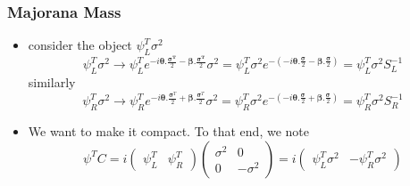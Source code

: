 \documentclass{beamer}
\begin{document}
 











 
\begin{frame}
	\frametitle{Majorana Mass}
		\begin{itemize}



		\item consider the object $\psi_{L}^{T}\sigma^{2}$	
		\pause
\[
\psi_{L}^{T}\sigma^{2}\rightarrow\psi_{L}^{T}e^{-i\mathbf{\theta}.\frac{\mathbf{\sigma^{T}}}{2}-\mathbf{\beta}.\frac{\mathbf{\sigma^{T}}}{2}}\sigma^{2}=\psi_{L}^{T}\sigma^{2}e^{-\left(-i\mathbf{\theta}.\frac{\mathbf{\sigma}}{2}-\mathbf{\beta}.\frac{\mathbf{\sigma}}{2}\right)}=\psi_{L}^{T}\sigma^{2}S_{L}^{-1}
\]
		\pause
		similarly
\[
\psi_{R}^{T}\sigma^{2}\rightarrow\psi_{R}^{T}e^{-i\mathbf{\theta}.\frac{\mathbf{\sigma}^{T}}{2}+\mathbf{\beta}.\frac{\mathbf{\sigma}^{T}}{2}}\sigma^{2}=\psi_{R}^{T}\sigma^{2}e^{-\left(-i\mathbf{\theta}.\frac{\mathbf{\sigma}}{2}+\mathbf{\beta}.\frac{\mathbf{\sigma}}{2}\right)}=\psi_{R}^{T}\sigma^{2}S_{R}^{-1}
\]
\pause

		\item We want to make it compact. To that end, we note
		\pause
\[
\psi^{T}C=i\left(\begin{array}{cc}
\psi_{L}^{T} & \psi_{R}^{T}\end{array}\right)\left(\begin{array}{cc}
\sigma^{2} & 0\\
0 & -\sigma^{2}
\end{array}\right)=i\left(\begin{array}{cc}
\psi_{L}^{T}\sigma^{2} & -\psi_{R}^{T}\sigma^{2}\end{array}\right)
\]
\pause
	\end{itemize}
\end{frame}

 
\end{document}
